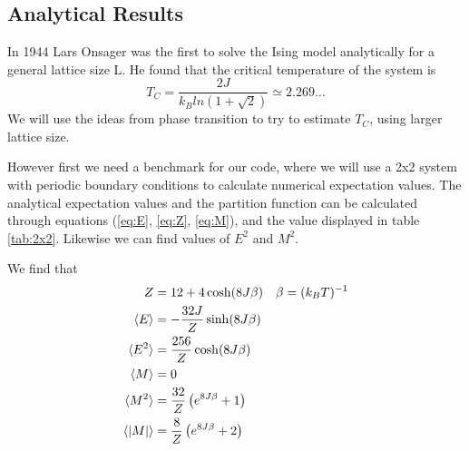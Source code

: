 \documentclass[%
reprint,
nofootinbib,
amsmath,amssymb,
aps,
]{revtex4-1}
\begin{document}
\subsection{Analytical Results}
In 1944 Lars Onsager was the first to solve the Ising model analytically for a general lattice size L\cite{LarsOnsager}. He found that the critical temperature of the system is 
\begin{equation}
	T_C = \frac{2J}{k_Bln(1+\sqrt{2})}\simeq 2.269\dots
\end{equation} 
We will use the ideas from phase transition to try to estimate $T_C$, using larger lattice size. 

However first we need a benchmark for our code, where we will use a 2x2 system with periodic boundary conditions to calculate numerical expectation values. The analytical expectation values and the partition function can be calculated through equations (\ref{eq:E}, \ref{eq:Z}, \ref{eq:M}), and the value displayed in table \ref{tab:2x2}. Likewise we can find values of $E^2$ and $M^2$. 

We find that 
\begin{align}
	Z &= 12 + 4\cosh(8J\beta) && \beta = (k_BT)^{-1}\\
	\langle E\rangle &= -\frac{32J}{Z}\sinh(8J\beta)\\
	\langle E^2\rangle &= \frac{256}{Z}\cosh(8J\beta)\\
	\langle M\rangle &= 0\\
	\langle M^2\rangle &=\frac{32}{Z}\left(e^{8J\beta} + 1\right)\\
	\langle \abs{M}\rangle &= \frac{8}{Z}\left(e^{8J\beta} + 2\right)
\end{align}
\end{document}
